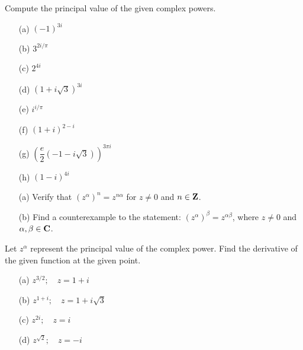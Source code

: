 \vspace{0.1in}

\begin{problem}\label{prob 10.2}
Compute the principal value of the given complex powers.
\begin{multicols}{2}
\begin{itemize}
\item[(a)] $(-1)^{3i}$
\item[(b)] $3^{2i/\pi}$
\item[(c)] $2^{4i}$
\item[(d)] $(1+i\sqrt{3})^{3i}$
\item[(e)] $i^{i/\pi}$
\item[(f)] $(1 + i)^{2 - i}$
\item[(g)] $\left(\dfrac{e}{2}(-1-i\sqrt{3})\right)^{3\pi i}$
\item[(h)] $(1 - i)^{4i}$
\end{itemize}
\end{multicols}
\end{problem}

\vspace{0.1in}

\begin{problem}\label{prob 10.3}\hfill
\begin{itemize}
\item[(a)] Verify that $(z^\alpha)^n = z^{n\alpha}$ for $z \neq 0$ and $n \in \mathbf Z$.
\item[(b)] Find a counterexample to the statement: $(z^{\alpha})^\beta = z^{\alpha\beta}$, where $z \neq 0$ and $\alpha,\beta \in \mathbf C$.
\end{itemize}
\end{problem}

\vspace{0.1in}

\begin{problem}\label{prob 10.4}
Let $z^\alpha$ represent the principal value of the complex power. Find the derivative of the given function at the given point.
\begin{multicols}{2}
\begin{itemize}
\item[(a)] $z^{3/2};\quad z = 1 + i$
\item[(b)] $z^{1 + i};\quad z = 1 + i\sqrt{3}$
\item[(c)] $z^{2i};\quad z = i$
\item[(d)] $z^{\sqrt{2}};\quad z = -i$
\end{itemize}
\end{multicols}
\end{problem}

